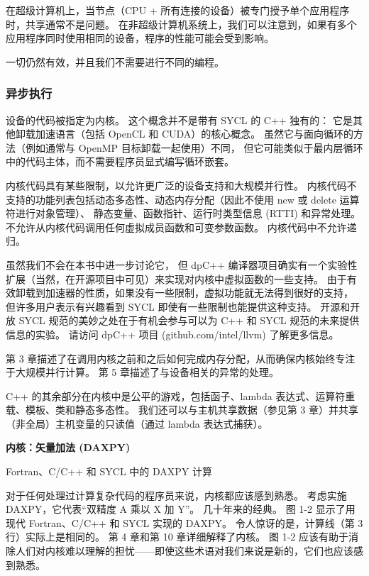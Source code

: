 在超级计算机上，当节点（CPU + 所有连接的设备）被专门授予单个应用程序时，共享通常不是问题。 
在非超级计算机系统上，我们可以注意到，如果有多个应用程序同时使用相同的设备，程序的性能可能会受到影响。

一切仍然有效，并且我们不需要进行不同的编程。

\subsubsection{异步执行}
设备的代码被指定为内核。 这个概念并不是带有 SYCL 的 C++ 独有的：
它是其他卸载加速语言（包括 OpenCL 和 CUDA）的核心概念。 
虽然它与面向循环的方法（例如通常与 OpenMP 目标卸载一起使用）不同，
但它可能类似于最内层循环中的代码主体，而不需要程序员显式编写循环嵌套。

内核代码具有某些限制，以允许更广泛的设备支持和大规模并行性。 
内核代码不支持的功能列表包括动态多态性、动态内存分配（因此不使用 new 或 delete 运算符进行对象管理）、
静态变量、函数指针、运行时类型信息 (RTTI) 和异常处理。 不允许从内核代码调用任何虚拟成员函数和可变参数函数。 
内核代码中不允许递归。

\begin{remark}[虚函数]
	虽然我们不会在本书中进一步讨论它，
	但 dpC++ 编译器项目确实有一个实验性扩展（当然，在开源项目中可见）来实现对内核中虚拟函数的一些支持。 
	由于有效卸载到加速器的性质，如果没有一些限制，虚拟功能就无法得到很好的支持，
	但许多用户表示有兴趣看到 SYCL 即使有一些限制也能提供这种支持。 
	开源和开放 SYCL 规范的美妙之处在于有机会参与可以为 C++ 和 SYCL 规范的未来提供信息的实验。 
	请访问 dpC++ 项目 (github.com/intel/llvm) 了解更多信息。
\end{remark}

第 3 章描述了在调用内核之前和之后如何完成内存分配，从而确保内核始终专注于大规模并行计算。 
第 5 章描述了与设备相关的异常的处理。

C++ 的其余部分在内核中是公平的游戏，包括函子、lambda 表达式、运算符重载、模板、类和静态多态性。 
我们还可以与主机共享数据（参见第 3 章）并共享（非全局）主机变量的只读值（通过 lambda 表达式捕获）。

\textbf{内核：矢量加法 (DAXPY)}

{\color{red} Fortran、C/C++ 和 SYCL 中的 DAXPY 计算 }

对于任何处理过计算复杂代码的程序员来说，内核都应该感到熟悉。 
考虑实施 DAXPY，它代表“双精度 A 乘以 X 加 Y”。 几十年来的经典。 
图 1-2 显示了用现代 Fortran、C/C++ 和 SYCL 实现的 DAXPY。 
令人惊讶的是，计算线（第 3 行）实际上是相同的。 第 4 章和第 10 章详细解释了内核。 
图 1-2 应该有助于消除人们对内核难以理解的担忧——即使这些术语对我们来说是新的，它们也应该感到熟悉。

